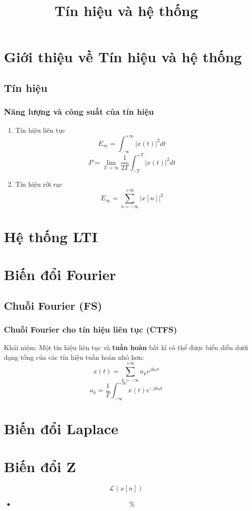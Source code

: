 \documentclass{article}
\title{Tín hiệu và hệ thống}
\begin{document}
\maketitle
\section{Giới thiệu về Tín hiệu và hệ thống}
\subsection{Tín hiệu}
\subsubsection{Năng lượng và công suất của tín hiệu}
\begin{enumerate}
    \item Tín hiệu liên tục
    $$E_{\infty}=\int_{-\infty}^{+\infty}|x(t)|^2dt$$
    $$P=\lim_{T\to\infty}\frac{1}{2T}\int_{-T}^{+T}|x(t)|^2dt$$
    \item Tín hiệu rời rạc
    $$E_{\infty}=\sum_{n=-\infty}^{+\infty}|x[n]|^2$$
\end{enumerate}
\section{Hệ thống LTI}
\section{Biến đổi Fourier}
\subsection{Chuỗi Fourier (FS)}
\subsubsection{Chuỗi Fourier cho tín hiệu liên tục (CTFS)}
Khái niệm: Một tín hiệu liên tục và \textbf{tuần hoàn} bất kì có thể được biểu diễn dưới dạng tổng của các tín hiệu tuần hoàn nhỏ hơn:
$$x(t)=\sum_{k=-\infty}^{+\infty}a_{k}e^{jk\omega t}$$
$$a_{k}=\frac{1}{T}\int_{-\infty}^{+\infty}x(t)e^{-jk\omega t}$$
\section{Biến đổi Laplace}
\section{Biến đổi Z}
$$\mathscr{L}(x[n])$$
\begin{itemize}
    \item $$\%$$
\end{itemize}
\end{document}
